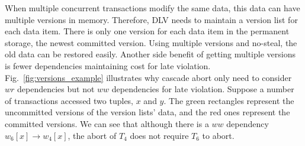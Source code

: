 \documentclass[conference]{IEEEtran}
\begin{document}
When multiple concurrent transactions modify the same data, this data can have multiple versions in memory.
Therefore, DLV needs to maintain a version list for each data item.
There is only one version for each data item in the permanent storage, the newest committed version.
Using multiple versions and no-steal, the old data can be restored easily.
Another side benefit of getting multiple versions is fewer dependencies maintaining cost for late violation.
Fig.~\ref{fig:versions_example} illustrates why cascade abort only need to consider $wr$ dependencies but not $ww$ dependencies for late violation. 
Suppose a number of transactions accessed two tuples, ${x}$ and ${y}$.
The green rectangles represent the uncommitted versions of the version lists' data, and the red ones represent the committed versions.
We can see that although there is a ${ww}$ dependency ${w_6[x] \rightarrow w_4[x]}$,
the abort of $T_4$ does not require ${T_6}$ to abort.
\end{document}
